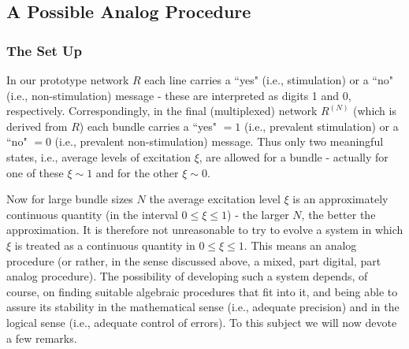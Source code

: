 \documentclass[twocolumn,preprintnumbers,amsmath,amssymb,floatfix]{revtex4}
\begin{document}
\subsection{\label{sec:twelve2}A Possible Analog Procedure}

\subsubsection{\label{sec:twelve2_1}The Set Up} In our prototype
network $R$ each line carries a ``yes" (i.e., stimulation) or a
``no" (i.e., non-stimulation) message - these are interpreted as
digits 1 and 0, respectively. Correspondingly, in the final
(multiplexed) network $R^{(N)}$ (which is derived from $R$) each
bundle carries a ``yes" $= 1$ (i.e., prevalent stimulation) or a
``no" $=0$ (i.e., prevalent non-stimulation) message. Thus only
two meaningful states, i.e., average levels of excitation $\xi$,
are allowed for a bundle - actually for one of these $\xi\sim1$
and for the other $\xi\sim0$.

Now for large bundle sizes $N$ the average excitation level $\xi$
is an approximately continuous quantity (in the interval
$0\leq\xi\leq1$) - the larger $N$, the better the approximation.
It is therefore not unreasonable to try to evolve a system in
which $\xi$ is treated as a continuous quantity in
$0\leq\xi\leq1$. This means an analog procedure (or rather, in the
sense discussed above, a mixed, part digital, part analog
procedure). The possibility of developing such a system depends,
of course, on finding suitable algebraic procedures that fit into
it, and being able to assure its stability in the mathematical
sense (i.e., adequate precision) and in the logical sense (i.e.,
adequate control of errors). To this subject we will now devote a
few remarks.
\end{document}
